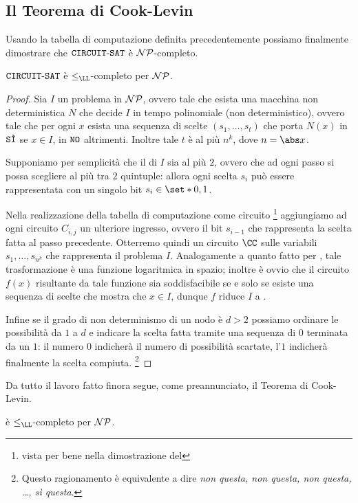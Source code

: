\subsection{Il Teorema di Cook-Levin}

Usando la tabella di computazione definita precedentemente possiamo finalmente
dimostrare che $\CSAT$ è $\NP$-completo.

\begin{theorem}
  $\CSAT$ è $\leq_{\LL}$-completo per $\NP$.   
\end{theorem}
\begin{proof}
  Sia $I$ un problema in $\NP$, ovvero tale che esista una macchina non deterministica
  $N$ che decide $I$ in tempo polinomiale (non deterministico), ovvero tale che
  per ogni $x$ esista una sequenza di scelte $(s_1, \dots, s_t)$ che porta $N(x)$
  in $\SI$ se $x \in I$, in $\NO$ altrimenti. Inoltre tale $t$ è al più $n^k$, 
  dove $n = \abs x$.
  
  Supponiamo per semplicità che il  di $I$ 
  sia al più $2$, ovvero che ad ogni passo si possa scegliere al più tra $2$ 
  quintuple: allora ogni scelta $s_i$ può essere rappresentata con un singolo bit
  $s_i \in \set*{0, 1}$.
  
  Nella realizzazione della tabella di computazione come circuito
  \footnote{vista per bene nella dimostrazione del }
  aggiungiamo ad ogni circuito $C_{i, j}$ un ulteriore ingresso, 
  ovvero il bit $s_{i-1}$ che rappresenta la scelta fatta al passo precedente.
  Otterremo quindi un circuito $\CC$ sulle variabili $s_1, \dots, s_{n^{\!k}}$
  che rappresenta il problema $I$. Analogamente a quanto fatto per \CVAL,
  tale trasformazione è una funzione logaritmica in spazio; inoltre è ovvio
  che il circuito $f(x)$ risultante da tale funzione sia soddisfacibile se e solo se
  esiste una sequenza di scelte che mostra che $x \in I$, dunque $f$ riduce
  $I$ a \CSAT.

  Infine se il grado di non determinismo di un nodo è $d > 2$ possiamo 
  ordinare le possibilità da $1$ a $d$ e indicare la scelta fatta 
  tramite una sequenza di $0$ terminata da un $1$: il numero $0$ indicherà 
  il numero di possibilità scartate, l'$1$ indicherà finalmente la scelta compiuta.
  \footnote{Questo ragionamento è equivalente a dire \emph{non questa, non questa,
  non questa, \dots, sì questa}.}
\end{proof}

Da tutto il lavoro fatto finora segue, come preannunciato, il Teorema di Cook-Levin.

\begin{theorem}
  \SAT{} è $\leq_{\LL}$-completo per $\NP$.   
\end{theorem}